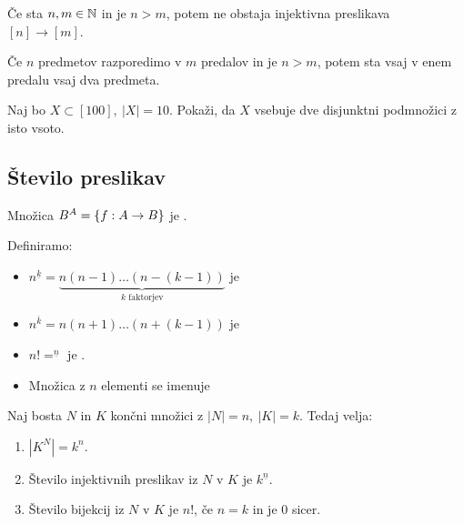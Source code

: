 \begin{trditev}
    Če sta $n, m \in \mathbb{N}$ in je $n > m$, potem ne obstaja injektivna preslikava $[n] \to [m]$.
\end{trditev}

\begin{opomba}
    Če $n$ predmetov razporedimo v $m$ predalov in je $n > m$, potem sta vsaj v enem predalu vsaj dva predmeta.
\end{opomba}

\begin{primer}
    Naj bo $X \subset [100], \ |X|=10$. Pokaži, da $X$ vsebuje dve disjunktni podmnožici z isto vsoto.
\end{primer}

\subsection{Število preslikav}
\begin{definicija}
    Množica $B^A = \left\{f: A \to B\right\}$ je .
\end{definicija}

\begin{definicija} Definiramo:
    \begin{itemize}
        \item $n^{\underline{k}} = \underbrace{n(n-1) \ldots (n-(k-1))}_\text{$k$ faktorjev}$ je 
        \item $n^{\overline{k}} = n(n+1) \ldots (n+(k-1))$ je 
        \item $n! = ^{\underline{n}}$ je .
        \item Množica z $n$ elementi se imenuje 
    \end{itemize}
\end{definicija}

\begin{trditev}
    Naj bosta $N$ in $K$ končni množici z $|N| = n, \ |K| = k$. Tedaj velja:
    \begin{enumerate}
        \item $|K^N| = k^n$.
        \item Število injektivnih preslikav iz $N$ v $K$ je $k^{\underline{n}}$.
        \item Število bijekcij iz $N$ v $K$ je $n!$, če $n = k$ in je $0$ sicer.
    \end{enumerate} 
\end{trditev}

